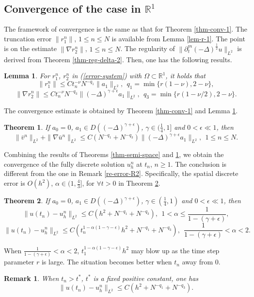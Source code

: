 \documentclass[11pt]{article}
\newtheorem{theorem}{Theorem}
\newtheorem{lemma}{Lemma}[section]
\newtheorem{remark}{Remark}[section]
\numberwithin{equation}{section}
\begin{document}
\subsection{Convergence of the case in $\mathbb{R}^1$}\label{con-1D}
The framework of convergence is the same as that for Theorem \ref{thm-conv-1}. The truncation error $\|r_1^n\|$, $1\leq n\leq N$ is available from Lemma \ref{lem-r-1}. The point is on the estimate $\|\nabla r_2^n\|$, $1\leq n\leq N$. The regularity of $\|\partial_t^m(-\Delta)^{\frac12}u\|_{L^2}$ is derived from Theorem \ref{thm-reg-delta-2}. Then,  one has the following results.
\begin{lemma}\label{lem-r-2-1D}
For $r_1^n$, $r_2^n$ in (\ref{error-system}) with $\Omega\subset \mathbb{R}^1$, it holds that
\[
\|r_1^n\| \le Ct_n^{-\nu}N^{-q_1}\|a_1\|_{L^2},~~q_1=\min\{r(1-\nu),2-\nu\},
\]
\[
\|\nabla r_2^n\| \le Ct_n^{-\nu}N^{-q_3}\|(-\Delta)^{\gamma+\epsilon}a_1\|_{L^2},~~q_3=\min\{r(1-\nu/2),2-\nu\}.
\]
\end{lemma}
The convergence estimate is obtained by Theorem \ref{thm-conv-1} and Lemma \ref{lem-r-2-1D}.
\begin{theorem}\label{thm-conv-2}
If $a_0=0$, $a_1\in D((-\Delta)^{\gamma+\epsilon})$, $\gamma\in(\frac{1}{4},1]$ and $0<\epsilon \ll 1$, then
\[
\|\bar v^n\|_{L^2}+\|\nabla \bar u^n\|_{L^2} \leq C(N^{-q_1}+N^{-q_3})\|(-\Delta)^{\gamma+\epsilon}a_1\|_{L^2},~~1\le n\le N.
\]
\end{theorem}

Combining the results of Theorems \ref{thm-semi-space} and \ref{thm-conv-2}, we obtain the convergence of the fully discrete solution $u_h^n$ at $t_n$, $n\geq1$. The conclusion is different from the one in Remark \ref{re-error-R2}. Specifically, the spatial discrete error is 
$O(h^2)$, $\alpha\in(1,\frac43]$, for $\forall t>0$ in Theorem \ref{thm-conv-3}.
\begin{theorem}\label{thm-conv-3}
If $a_0=0$, $a_1\in D((-\Delta)^{\gamma+\epsilon})$, $\gamma\in(\frac{1}{4},1)$ and $0<\epsilon \ll 1$, then
\[
\| u(t_n)-u_h^n\|_{L^2} \leq C(h^2+N^{-q_1}+N^{-q_3}),~~1<\alpha\leq \frac{1}{1-(\gamma+\epsilon)},
\]
\[
\| u(t_n)-u_h^n\|_{L^2} \leq C(t_n^{1-\alpha(1-\gamma-\epsilon)}h^2+N^{-q_1}+N^{-q_3}),~~ \frac{1}{1-(\gamma+\epsilon)}<\alpha<2.
\]
\end{theorem}

When $\frac{1}{1-(\gamma+\epsilon)}<\alpha<2$, $t_1^{1-\alpha(1-\gamma-\epsilon)}h^2$ may blow up as the time step parameter $r$ is large. The situation becomes better when $t_n$ away from 0. 
\begin{remark}
When $t_n>t^*$, $t^*$ is a fixed positive constant, one has
\[
\| u(t_n)-u_h^n\|_{L^2} \leq C(h^2+N^{-q_1}+N^{-q_3}).
\]
\end{remark}
\end{document}
